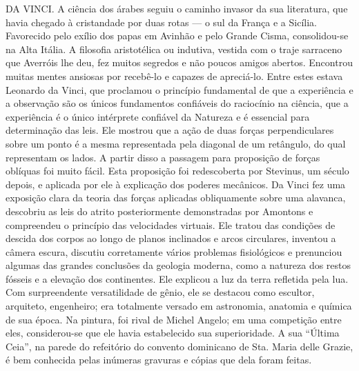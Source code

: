 \documentclass[11pt,a5paper,twoside,openany]{book}
\begin{document}
DA VINCI. A ciência dos árabes seguiu o caminho invasor da sua literatura, que havia chegado à cristandade por duas rotas — o sul da França e a Sicília. Favorecido pelo exílio dos papas em Avinhão e pelo Grande Cisma, consolidou-se na Alta Itália. A filosofia aristotélica ou indutiva, vestida com o traje sarraceno que Averróis lhe deu, fez muitos segredos e não poucos amigos abertos. Encontrou muitas mentes ansiosas por recebê-lo e capazes de apreciá-lo. Entre estes estava Leonardo da Vinci, que proclamou o princípio fundamental de que a experiência e a observação são os únicos fundamentos confiáveis ​​do raciocínio na ciência, que a experiência é o único intérprete confiável da Natureza e é essencial para determinação das leis. Ele mostrou que a ação de duas forças perpendiculares sobre um ponto é a mesma representada pela diagonal de um retângulo, do qual representam os lados. A partir disso a passagem para proposição de forças oblíquas foi muito fácil. Esta proposição foi redescoberta por Stevinus, um século depois, e aplicada por ele à explicação dos poderes mecânicos. Da Vinci fez uma exposição clara da teoria das forças aplicadas obliquamente sobre uma alavanca, descobriu as leis do atrito posteriormente demonstradas por Amontons e compreendeu o princípio das velocidades virtuais. Ele tratou das condições de descida dos corpos ao longo de planos inclinados e arcos circulares, inventou a câmera escura, discutiu corretamente vários problemas fisiológicos e prenunciou algumas das grandes conclusões da geologia moderna, como a natureza dos restos fósseis e a elevação dos continentes. Ele explicou a luz da terra refletida pela lua. Com surpreendente versatilidade de gênio, ele se destacou como escultor, arquiteto, engenheiro; era totalmente versado em astronomia, anatomia e química de sua época. Na pintura, foi rival de Michel Angelo; em uma competição entre eles, considerou-se que ele havia estabelecido sua superioridade. A sua “Última Ceia”, na parede do refeitório do convento dominicano de Sta. Maria delle Grazie, é bem conhecida pelas inúmeras gravuras e cópias que dela foram feitas.
\end{document}
